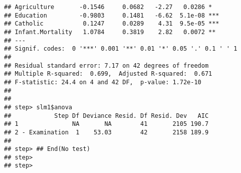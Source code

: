\documentclass{beamer}\usepackage[]{graphicx}\usepackage[]{color}
\newenvironment{knitrout}{}{} %
\begin{document}
\begin{frame}
\begin{knitrout}
\begin{verbatim}
## Agriculture       -0.1546     0.0682   -2.27   0.0286 *  
## Education         -0.9803     0.1481   -6.62  5.1e-08 ***
## Catholic           0.1247     0.0289    4.31  9.5e-05 ***
## Infant.Mortality   1.0784     0.3819    2.82   0.0072 ** 
## ---
## Signif. codes:  0 '***' 0.001 '**' 0.01 '*' 0.05 '.' 0.1 ' ' 1
## 
## Residual standard error: 7.17 on 42 degrees of freedom
## Multiple R-squared:  0.699,	Adjusted R-squared:  0.671 
## F-statistic: 24.4 on 4 and 42 DF,  p-value: 1.72e-10
## 
## 
## step> slm1$anova
##            Step Df Deviance Resid. Df Resid. Dev   AIC
## 1               NA       NA        41       2105 190.7
## 2 - Examination  1    53.03        42       2158 189.9
## 
## step> ## End(No test)
## step> 
## step>
\end{verbatim}

\end{knitrout}
\end{frame}
\end{document}
